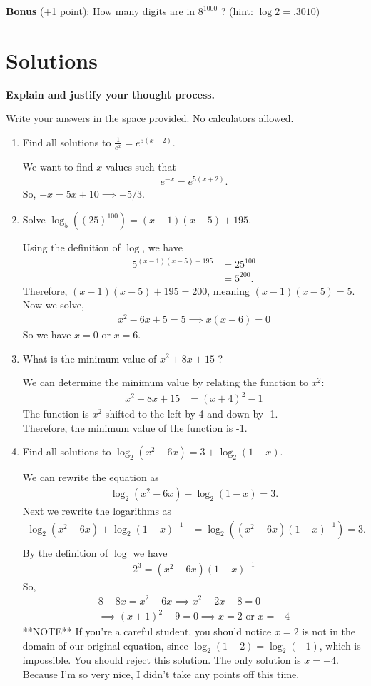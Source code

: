 \documentclass[a4paper, 12pt]{article}
\newcommand{\bt}[1]{\textbf{#1}} %
\newcommand{\eq}[1]{\begin{align*}#1\end{align*}} %
\renewcommand{\eq}[1]{\begin{align*}#1\end{align*}} %
\newcommand{\green}[1]{\textcolor{javagreen}{#1}} %
\begin{document}
\bt{Bonus} (+1 point): How many digits are in $8^{1000}$ ? (hint: $\log 2 = .3010$) 

\newpage

\section*{Solutions}

\bt{Explain and justify your thought process.}

Write your answers in the space provided. No calculators allowed.

\begin{enumerate}
    \item Find all solutions to $\frac{1}{e^x} = e^{5(x+2)}$.

    \green{
    We want to find $x$ values such that 
    \eq{
    e^{-x} = e^{5(x+2)}.
    }
    So, $-x = 5x + 10 \implies -5/3$.
    }
    \item Solve $\log_5 ((25)^{100}) = (x-1)(x-5) + 195$.

    \green{
    Using the definition of $\log$, we have
    \eq{
    5^{(x-1)(x-5)+195} &= 25^{100} \\
    & = 5^{200}.
    }
    Therefore, $(x-1)(x-5) + 195 = 200$, meaning $(x-1)(x-5) = 5$. \\
    Now we solve, 
    \eq{
    x^2 -6x + 5 = 5 \implies x(x-6) = 0 
    }
    So we have $x = 0$ or $x = 6$.
    }
    \item What is the minimum value of $x^2 + 8x + 15$ ?

    \green{
    We can determine the minimum value by relating the function to $x^2$: 
    \eq{
    x^2 + 8x + 15 &= (x+4)^2 -1 
    }
    The function is $x^2$ shifted to the left by 4 and down by -1.  \\
    Therefore, the minimum value of the function is -1.
    }
    \item Find all solutions to $\log_2 (x^2 - 6x) = 3 + \log_2 (1-x)$.

    \green{
    We can rewrite the equation as 
    \eq{
    \log_2(x^2 - 6x) - \log_2(1-x) = 3.
    }
    Next we rewrite the logarithms as 
    \eq{
    \log_2(x^2 -6x) + \log_2(1-x)^{-1} &= 
    \log_2((x^2 - 6x)(1-x)^{-1}) = 3.\\
    }
    By the definition of $\log$ we have
    \eq{
    2^3 = (x^2 - 6x)(1-x)^{-1}
    }
    So, 
    \eq{
    8 - 8x = x^2 -6x \implies x^2 +2x - 8 = 0\\
    \implies (x+1)^2 -9 = 0 \implies x = 2 \text{ or } x = -4
    }
    **NOTE**
    If you're a careful student, you should notice $x=2$ is not in the domain of 
    our original equation, since $\log_2(1-2) = \log_2(-1)$, which is impossible.
    You should reject this solution. The only solution is $x=-4$. 
    Because I'm so very nice, I didn't take any points off this time.
    }
\end{enumerate}
\end{document}
